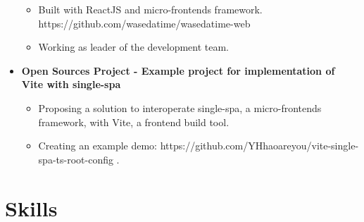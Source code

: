 \begin{itemize}[leftmargin=*]
\begin{itemize}
                \item Built with ReactJS and micro-frontends framework. https://github.com/wasedatime/wasedatime-web
                \item Working as leader of the development team.
        \end{itemize}
    \vspace{-10pt}
    \item{\textbf{Open Sources Project - Example project for implementation of Vite with single-spa}}
        \begin{itemize}
                \vspace{-5pt}
                \item Proposing a solution to interoperate single-spa, a micro-frontends framework, with Vite, a frontend build tool.
                \item Creating an example demo: https://github.com/YHhaoareyou/vite-single-spa-ts-root-config .
        \end{itemize}
\end{itemize}
\vspace{5pt}

\section{Skills}
\vspace{5pt}
\begin{itemize}[leftmargin=*]
\end{itemize}



